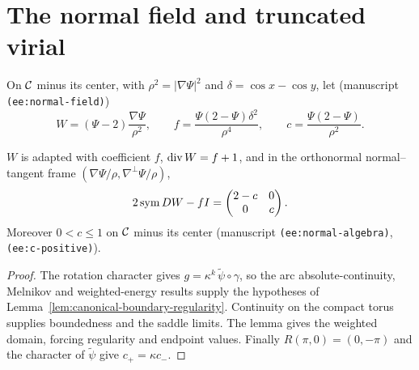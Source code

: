\section{The normal field and truncated virial}
\label{sec:ee-virial}

\begin{definition}
\label{def:normal-field}
\leanok
On $\mathcal{C}$ minus its center, with $\rho^2=|\nabla\Psi|^2$ and
$\delta=\cos x-\cos y$, let (manuscript \texttt{(ee:normal-field)})
\[
  W=(\Psi-2)\frac{\nabla\Psi}{\rho^2},\qquad
  f=\frac{\Psi(2-\Psi)\delta^2}{\rho^4},\qquad
  c=\frac{\Psi(2-\Psi)}{\rho^2}.
\]
\end{definition}

\begin{lemma}
\label{lem:normal-field-algebra}
\leanok
$W$ is adapted with coefficient $f$, $\operatorname{div} W=f+1$, and in the orthonormal
normal--tangent frame $(\nabla\Psi/\rho,\nabla^\perp\Psi/\rho)$,
\[
  2\operatorname{sym} DW-fI=\begin{pmatrix}2-c&0\\0&c\end{pmatrix}.
\]
Moreover $0<c\le1$ on $\mathcal{C}$ minus its center (manuscript
\texttt{(ee:normal-algebra)}, \texttt{(ee:c-positive)}).
\end{lemma}

\begin{proof}
\leanok
The rotation character gives $g=\kappa^k\,\tilde\psi\circ\gamma$, so the
arc absolute-continuity, Melnikov and weighted-energy results supply the
hypotheses of Lemma~\ref{lem:canonical-boundary-regularity}.
Continuity on the compact torus supplies boundedness and the saddle limits.
The lemma gives the weighted domain, forcing regularity and endpoint values.
Finally $R(\pi,0)=(0,-\pi)$ and the character of $\tilde\psi$ give
$c_+=\kappa c_-$.
\end{proof}

